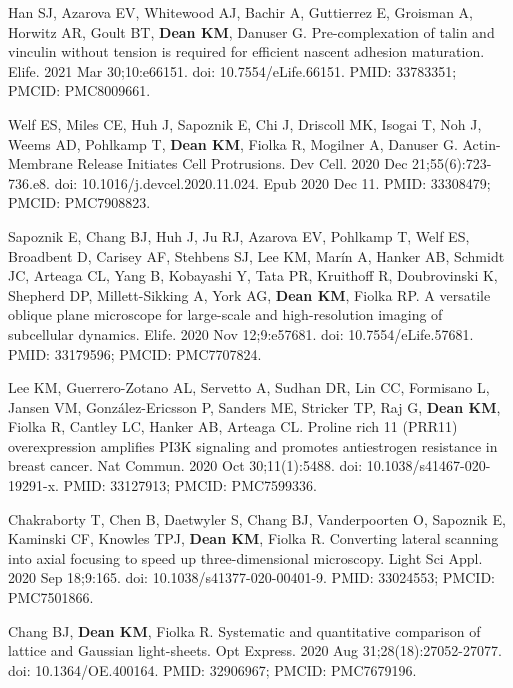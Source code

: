 \begin{etaremune}
\item Han SJ, Azarova EV, Whitewood AJ, Bachir A, Guttierrez E, Groisman A, Horwitz AR, Goult BT, \textbf{Dean KM}, Danuser G. Pre-complexation of talin and vinculin without tension is required for efficient nascent adhesion maturation. Elife. 2021 Mar 30;10:e66151. doi: 10.7554/eLife.66151. PMID: 33783351; PMCID: PMC8009661.

\item Welf ES, Miles CE, Huh J, Sapoznik E, Chi J, Driscoll MK, Isogai T, Noh J, Weems AD, Pohlkamp T, \textbf{Dean KM}, Fiolka R, Mogilner A, Danuser G. Actin-Membrane Release Initiates Cell Protrusions. Dev Cell. 2020 Dec 21;55(6):723-736.e8. doi: 10.1016/j.devcel.2020.11.024. Epub 2020 Dec 11. PMID: 33308479; PMCID: PMC7908823.

\item  Sapoznik E, Chang BJ, Huh J, Ju RJ, Azarova EV, Pohlkamp T, Welf ES, Broadbent D, Carisey AF, Stehbens SJ, Lee KM, Marín A, Hanker AB, Schmidt JC, Arteaga CL, Yang B, Kobayashi Y, Tata PR, Kruithoff R, Doubrovinski K, Shepherd DP, Millett-Sikking A, York AG, \textbf{Dean KM}, Fiolka RP. A versatile oblique plane microscope for large-scale and high-resolution imaging of subcellular dynamics. Elife. 2020 Nov 12;9:e57681. doi: 10.7554/eLife.57681. PMID: 33179596; PMCID: PMC7707824.

\item Lee KM, Guerrero-Zotano AL, Servetto A, Sudhan DR, Lin CC, Formisano L, Jansen VM, González-Ericsson P, Sanders ME, Stricker TP, Raj G, \textbf{Dean KM}, Fiolka R, Cantley LC, Hanker AB, Arteaga CL. Proline rich 11 (PRR11) overexpression amplifies PI3K signaling and promotes antiestrogen resistance in breast cancer. Nat Commun. 2020 Oct 30;11(1):5488. doi: 10.1038/s41467-020-19291-x. PMID: 33127913; PMCID: PMC7599336.

\item Chakraborty T, Chen B, Daetwyler S, Chang BJ, Vanderpoorten O, Sapoznik E, Kaminski CF, Knowles TPJ, \textbf{Dean KM}, Fiolka R. Converting lateral scanning into axial focusing to speed up three-dimensional microscopy. Light Sci Appl. 2020 Sep 18;9:165. doi: 10.1038/s41377-020-00401-9. PMID: 33024553; PMCID: PMC7501866.

\item Chang BJ, \textbf{Dean KM}, Fiolka R. Systematic and quantitative comparison of lattice and Gaussian light-sheets. Opt Express. 2020 Aug 31;28(18):27052-27077. doi: 10.1364/OE.400164. PMID: 32906967; PMCID: PMC7679196.


\end{etaremune}
